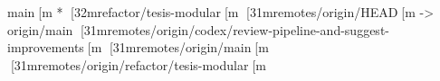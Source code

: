   main[m
* [32mrefactor/tesis-modular[m
  [31mremotes/origin/HEAD[m -> origin/main
  [31mremotes/origin/codex/review-pipeline-and-suggest-improvements[m
  [31mremotes/origin/main[m
  [31mremotes/origin/refactor/tesis-modular[m
